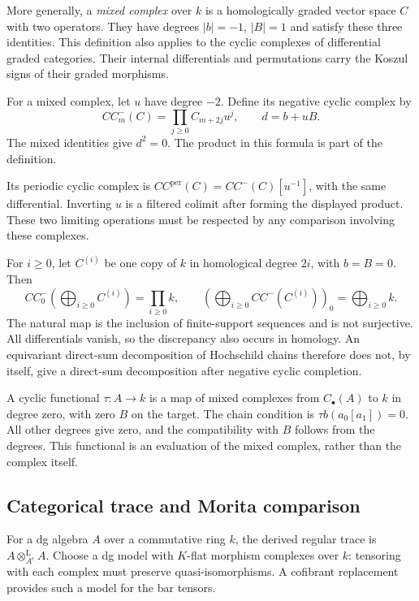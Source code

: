 More generally, a \emph{mixed complex} over $k$ is a homologically graded
vector space $C$ with two operators. They have degrees $|b|=-1$, $|B|=1$ and
satisfy these three identities. This definition also applies to the cyclic
complexes of differential graded categories. Their internal differentials
and permutations carry the Koszul signs of their graded morphisms.

For a mixed complex, let $u$ have degree $-2$. Define its negative cyclic
complex by
\begin{equation}
\label{v4-arith:traces:negative-cyclic}
 CC^-_m(C)=\prod_{j\geq0} C_{m+2j}u^j,
 \qquad d=b+uB.
\end{equation}
The mixed identities give $d^2=0$. The product in this formula is part of
the definition.

Its periodic cyclic complex is $CC^{\mathrm{per}}(C)=CC^-(C)[u^{-1}]$, with
the same differential. Inverting $u$ is a filtered colimit after forming the
displayed product. These two limiting operations must be respected by any
comparison involving these complexes.

\begin{example}
\label{v4-arith:traces:sum-product}
For $i\geq0$, let $C^{(i)}$ be one copy of $k$ in homological degree $2i$,
with $b=B=0$. Then
\[
 CC^-_0\left(\bigoplus_{i\geq0}C^{(i)}\right)
   =\prod_{i\geq0}k,
 \qquad
 \left(\bigoplus_{i\geq0}CC^-(C^{(i)})\right)_0
   =\bigoplus_{i\geq0}k.
\]
The natural map is the inclusion of finite-support sequences and is not
surjective. All differentials vanish, so the discrepancy also occurs in
homology. An equivariant direct-sum decomposition of Hochschild chains
therefore does not, by itself, give a direct-sum decomposition after
negative cyclic completion.
\end{example}

A cyclic functional $\tau:A\to k$ is a map of mixed complexes from
$C_\bullet(A)$ to $k$ in degree zero, with zero $B$ on the target. The chain
condition is $\tau b(a_0[a_1])=0$. All other degrees give zero, and the
compatibility with $B$ follows from the degrees. This functional is an
evaluation of the mixed complex, rather than the complex itself.

\subsection{Categorical trace and Morita comparison}

For a dg algebra $A$ over a commutative ring $k$, the derived regular trace
is $A\otimes_{A^e}^{\mathrm L}A$. Choose a dg model with $K$-flat morphism
complexes over $k$: tensoring with each complex must preserve
quasi-isomorphisms. A cofibrant replacement provides such a model for the
bar tensors.

